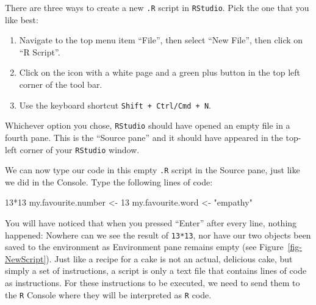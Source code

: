 \documentclass[
  letterpaper,
  DIV=11,
  numbers=noendperiod]{scrreprt}
\newenvironment{Shaded}{\begin{snugshade}}{\end{snugshade}}
\newcommand{\DecValTok}[1]{\textcolor[rgb]{0.68,0.00,0.00}{#1}}
\newcommand{\NormalTok}[1]{\textcolor[rgb]{0.00,0.23,0.31}{#1}}
\newcommand{\OtherTok}[1]{\textcolor[rgb]{0.00,0.23,0.31}{#1}}
\newcommand{\SpecialCharTok}[1]{\textcolor[rgb]{0.37,0.37,0.37}{#1}}
\newcommand{\StringTok}[1]{\textcolor[rgb]{0.13,0.47,0.30}{#1}}
\providecommand{\tightlist}{%
  \setlength{\itemsep}{0pt}\setlength{\parskip}{0pt}}\usepackage{longtable,booktabs,array}
\begin{document}
There are three ways to create a new \texttt{.R} script in
\texttt{RStudio}. Pick the one that you like best:

\begin{enumerate}
\def\labelenumi{\arabic{enumi}.}
\tightlist
\item
  Navigate to the top menu item ``File'', then select ``New File'', then
  click on ``R Script''.
\item
  Click on the icon with a white page and a green plus button in the top
  left corner of the tool bar.
\item
  Use the keyboard shortcut \texttt{Shift\ +\ Ctrl/Cmd\ +\ N}.
\end{enumerate}

Whichever option you chose, \texttt{RStudio} should have opened an empty
file in a fourth pane. This is the ``Source pane'' and it should have
appeared in the top-left corner of your \texttt{RStudio} window.

We can now type our code in this empty \texttt{.R} script in the Source
pane, just like we did in the Console. Type the following lines of code:

\begin{Shaded}
\begin{Highlighting}[]
\DecValTok{13}\SpecialCharTok{*}\DecValTok{13}
\NormalTok{my.favourite.number }\OtherTok{\textless{}{-}} \DecValTok{13}
\NormalTok{my.favourite.word }\OtherTok{\textless{}{-}} \StringTok{"empathy"}
\end{Highlighting}
\end{Shaded}

You will have noticed that when you pressed ``Enter'' after every line,
nothing happened: Nowhere can we see the result of \texttt{13*13}, nor
have our two objects been saved to the environment as Environment pane
remains empty (see Figure~\ref{fig-NewScript}). Just like a recipe for a
cake is not an actual, delicious cake, but simply a set of instructions,
a script is only a text file that contains lines of code as
instructions. For these instructions to be executed, we need to send
them to the \texttt{R} Console where they will be interpreted as
\texttt{R} code.
\end{document}
